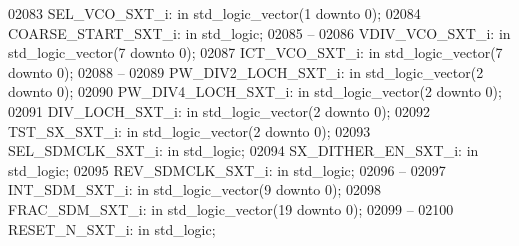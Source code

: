 \begin{DoxyCode}
02083     SEL\_VCO\_SXT\_i:  \textcolor{keywordflow}{in} \textcolor{comment}{std\_logic\_vector}(\textcolor{vhdllogic}{}\textcolor{vhdllogic}{1} \textcolor{keywordflow}{downto} \textcolor{vhdllogic}{}\textcolor{vhdllogic}{0});
02084     COARSE\_START\_SXT\_i: \textcolor{keywordflow}{in} \textcolor{comment}{std\_logic};
02085 \textcolor{keyword}{    --}
02086     VDIV\_VCO\_SXT\_i: \textcolor{keywordflow}{in} \textcolor{comment}{std\_logic\_vector}(\textcolor{vhdllogic}{}\textcolor{vhdllogic}{7} \textcolor{keywordflow}{downto} \textcolor{vhdllogic}{}\textcolor{vhdllogic}{0});
02087     ICT\_VCO\_SXT\_i:  \textcolor{keywordflow}{in} \textcolor{comment}{std\_logic\_vector}(\textcolor{vhdllogic}{}\textcolor{vhdllogic}{7} \textcolor{keywordflow}{downto} \textcolor{vhdllogic}{}\textcolor{vhdllogic}{0});
02088 \textcolor{keyword}{    --}
02089     PW\_DIV2\_LOCH\_SXT\_i: \textcolor{keywordflow}{in} \textcolor{comment}{std\_logic\_vector}(\textcolor{vhdllogic}{}\textcolor{vhdllogic}{2} \textcolor{keywordflow}{downto} \textcolor{vhdllogic}{}\textcolor{vhdllogic}{0});
02090     PW\_DIV4\_LOCH\_SXT\_i: \textcolor{keywordflow}{in} \textcolor{comment}{std\_logic\_vector}(\textcolor{vhdllogic}{}\textcolor{vhdllogic}{2} \textcolor{keywordflow}{downto} \textcolor{vhdllogic}{}\textcolor{vhdllogic}{0});
02091     DIV\_LOCH\_SXT\_i: \textcolor{keywordflow}{in} \textcolor{comment}{std\_logic\_vector}(\textcolor{vhdllogic}{}\textcolor{vhdllogic}{2} \textcolor{keywordflow}{downto} \textcolor{vhdllogic}{}\textcolor{vhdllogic}{0});
02092     TST\_SX\_SXT\_i:   \textcolor{keywordflow}{in} \textcolor{comment}{std\_logic\_vector}(\textcolor{vhdllogic}{}\textcolor{vhdllogic}{2} \textcolor{keywordflow}{downto} \textcolor{vhdllogic}{}\textcolor{vhdllogic}{0});
02093     SEL\_SDMCLK\_SXT\_i:   \textcolor{keywordflow}{in} \textcolor{comment}{std\_logic};
02094     SX\_DITHER\_EN\_SXT\_i: \textcolor{keywordflow}{in} \textcolor{comment}{std\_logic};
02095     REV\_SDMCLK\_SXT\_i:   \textcolor{keywordflow}{in} \textcolor{comment}{std\_logic};
02096 \textcolor{keyword}{    --}
02097     INT\_SDM\_SXT\_i:  \textcolor{keywordflow}{in} \textcolor{comment}{std\_logic\_vector}(\textcolor{vhdllogic}{}\textcolor{vhdllogic}{9} \textcolor{keywordflow}{downto} \textcolor{vhdllogic}{}\textcolor{vhdllogic}{0});
02098     FRAC\_SDM\_SXT\_i: \textcolor{keywordflow}{in} \textcolor{comment}{std\_logic\_vector}(\textcolor{vhdllogic}{}\textcolor{vhdllogic}{19} \textcolor{keywordflow}{downto} \textcolor{vhdllogic}{}\textcolor{vhdllogic}{0});
02099 \textcolor{keyword}{    --}
02100     RESET\_N\_SXT\_i:  \textcolor{keywordflow}{in} \textcolor{comment}{std\_logic};

\end{DoxyCode}
